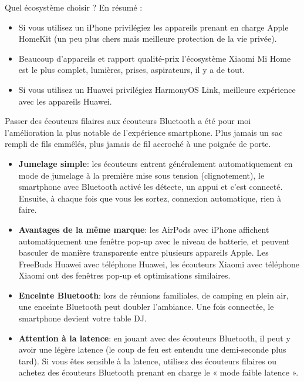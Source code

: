 Quel écosystème choisir ? En résumé :

\begin{itemize}
  \item Si vous utilisez un iPhone privilégiez les appareils prenant en charge Apple HomeKit (un peu plus chers mais meilleure protection de la vie privée).
  \item Beaucoup d'appareils et rapport qualité-prix l'écosystème Xiaomi Mi Home est le plus complet, lumières, prises, aspirateurs, il y a de tout.
  \item Si vous utilisez un Huawei privilégiez HarmonyOS Link, meilleure expérience avec les appareils Huawei.
\end{itemize}


Passer des écouteurs filaires aux écouteurs Bluetooth a été pour moi l'amélioration la plus notable de l'expérience smartphone. Plus jamais un sac rempli de fils emmêlés, plus jamais de fil accroché à une poignée de porte.

\begin{itemize}
  \item \textbf{Jumelage simple}: les écouteurs entrent généralement automatiquement en mode de jumelage à la première mise sous tension (clignotement), le smartphone avec Bluetooth activé les détecte, un appui et c'est connecté. Ensuite, à chaque fois que vous les sortez, connexion automatique, rien à faire.
  \item \textbf{Avantages de la même marque}: les AirPods avec iPhone affichent automatiquement une fenêtre pop-up avec le niveau de batterie, et peuvent basculer de manière transparente entre plusieurs appareils Apple. Les FreeBuds Huawei avec téléphone Huawei, les écouteurs Xiaomi avec téléphone Xiaomi ont des fenêtres pop-up et optimisations similaires.
  \item \textbf{Enceinte Bluetooth}: lors de réunions familiales, de camping en plein air, une enceinte Bluetooth peut doubler l'ambiance. Une fois connectée, le smartphone devient votre table DJ.
  \item \textbf{Attention à la latence}: en jouant avec des écouteurs Bluetooth, il peut y avoir une légère latence (le coup de feu est entendu une demi-seconde plus tard). Si vous êtes sensible à la latence, utilisez des écouteurs filaires ou achetez des écouteurs Bluetooth prenant en charge le « mode faible latence ».
\end{itemize}

